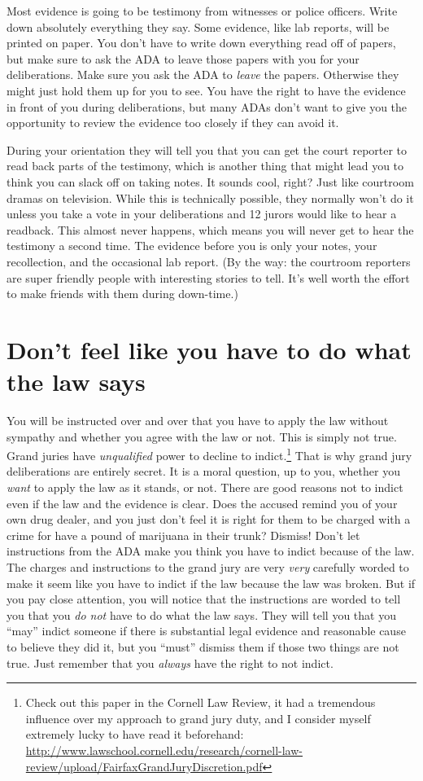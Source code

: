 \documentclass[letterpaper]{article}
\begin{document}
Most evidence is going to be testimony from witnesses or police officers.  
Write down absolutely everything they say. 
Some evidence, like lab reports, will be printed on paper. 
You don't have to write down everything read off of papers, but make sure to ask the ADA to leave those papers with you for your deliberations. 
Make sure you ask the ADA to \emph{leave} the papers.
Otherwise they might just hold them up for you to see.
You have the right to have the evidence in front of you during deliberations, but many ADAs don't want to give you the opportunity to review the evidence too closely if they can avoid it.

During your orientation they will tell you that you can get the court reporter to read back parts of the testimony, which is another thing that might lead you to think you can slack off on taking notes.
It sounds cool, right? Just like courtroom dramas on television.
While this is technically possible, they normally won't do it unless you take a vote in your deliberations and 12 jurors would like to hear a readback. 
This almost never happens, which means you will never get to hear the testimony a second time.
The evidence before you is only your notes, your recollection, and the occasional lab report.
(By the way: the courtroom reporters are super friendly people with interesting stories to tell.
It's well worth the effort to make friends with them during down-time.)


\section*{Don't feel like you have to do what the law says}
You will be instructed over and over that you have to apply the law without sympathy and whether you agree with the law or not. 
This is simply not true.
Grand juries have \emph{unqualified} power to decline to indict.\footnote{Check out this paper in the Cornell Law Review, it had a tremendous influence over my approach to grand jury duty, and I consider myself extremely lucky to have read it beforehand: \url{http://www.lawschool.cornell.edu/research/cornell-law-review/upload/FairfaxGrandJuryDiscretion.pdf}} 
That is why grand jury deliberations are entirely secret. 
It is a moral question, up to you, whether you \emph{want} to apply the law as it stands, or not. 
There are good reasons not to indict even if the law and the evidence is clear. Does the accused remind you of your own drug dealer, and you just don't feel it is right for them to be charged with a crime for have a pound of marijuana in their trunk? Dismiss! 
Don't let instructions from the ADA make you think you have to indict because of the law.
The charges and instructions to the grand jury are very \emph{very} carefully worded to make it seem like you have to indict if the law because the law was broken.
But if you pay close attention, you will notice that the instructions are worded to tell you that you \emph{do not} have to do what the law says.
They will tell you that you ``may'' indict someone if there is substantial legal evidence and reasonable cause to believe they did it, but you ``must'' dismiss them if those two things are not true.  
Just remember that you \emph{always} have the right to not indict. 
\end{document}
